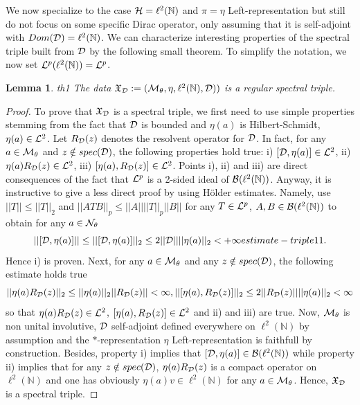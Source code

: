 \documentclass[10pt]{book}
\theoremstyle{break}
\newtheorem{lemma}{Lemma}
\begin{document}
We now specialize to the case ${\cal{H}}=\ell^2(\mathbb{N})$ and $\pi=\eta$ {Left-representation} but still do not focus on some specific Dirac operator, only assuming that it is self-adjoint with $Dom({\cal{D}})=\ell^2(\mathbb{N})$. We can characterize interesting properties of the spectral triple built from ${\cal{D}}$ by the following small theorem. To simplify the notation, we now set 
${\cal{L}}^p(\ell^2(\mathbb{N}))={\cal{L}}^p$.
\begin{lemma}{th1}
The data $\mathfrak{X}_{{\cal{D}}}:=({\cal{M}}_\theta,\eta,\ell^2(\mathbb{N}), {\cal{D}}))$ is a regular spectral triple.
\end{lemma}
\begin{proof}
To prove that $\mathfrak{X}_{{\cal{D}}}$ is a spectral triple, we first need to use simple properties stemming from the fact that ${\cal{D}}$ is bounded and $\eta(a)$ is Hilbert-Schmidt, $\eta(a)\in{\cal{L}}^2$. Let $R_{\cal{D}}(z)$ denotes the resolvent operator for ${\cal{D}}$. In fact, for any $a\in{\cal{M}}_\theta$ and $z\notin spec({\cal{D}})$, the following properties hold true: i) $[{\cal{D}},\eta(a)]\in{\cal{L}}^2$, ii) $\eta(a)R_{\cal{D}}(z)\in{\cal{L}}^2$, iii) $[\eta(a),R_{\cal{D}}(z)]\in{\cal{L}}^2$. Points i), ii) and iii) are direct consequences of the fact that ${\cal{L}}^p$ is a 2-sided ideal of ${\cal{B}}(\ell^2(\mathbb{N}))$. Anyway, it is instructive to give a less direct proof by using H\"older estimates. Namely, use $||T||\le||T||_2$ and $||ATB||_p\le||A||||T||_p||B||$ for any $T\in{\cal{L}}^p$, $A,B\in{\cal{B}}(\ell^2(\mathbb{N}))$ to obtain for any $a\in{\cal{N}}_\theta$
\begin{equation*}
||[{\cal{D}},\eta(a)]||\le||[{\cal{D}},\eta(a)]||_2\le2||{\cal{D}}||||\eta(a)||_2<+\infty{estimate-triple11}.
\end{equation*}
Hence i) is proven. Next, for any $a\in{\cal{M}}_\theta$ and any $z\notin spec({\cal{D}})$, the following estimate holds true
\begin{equation*}
||\eta(a)R_{\cal{D}}(z)||_2\le||\eta(a)||_2||R_{\cal{D}}(z)||<\infty, ||[\eta(a),R_{\cal{D}}(z)]||_2\le2||R_{\cal{D}}(z)||||\eta(a)||_2<\infty
\end{equation*}
so that $\eta(a)R_{{\cal{D}}}(z)\in{\cal{L}}^2$, $[\eta(a),R_{\cal{D}}(z)]\in{\cal{L}}^2$ and ii) and iii) are true.
Now, ${\cal{M}}_\theta$ is non unital involutive, ${\cal{D}}$ self-adjoint defined everywhere on $\ell^2(\mathbb{N})$ by assumption and the $*$-representation $\eta$ {Left-representation} is faithfull by construction. Besides, property i) implies that $[{\cal{D}},\eta(a)]\in{\cal{B}}(\ell^2(\mathbb{N}))$ while property ii) implies that for any $z\notin spec({\cal{D}})$, $\eta(a)R_{\cal{D}}(z)$ is a compact operator on $\ell^2(\mathbb{N})$ and one has obviously $\eta(a)v\in\ell^2(\mathbb{N})$ for any $a\in{\cal{M}}_\theta$. Hence, $\mathfrak{X}_{{\cal{D}}}$ is a spectral triple.

\end{proof}
\end{document}
